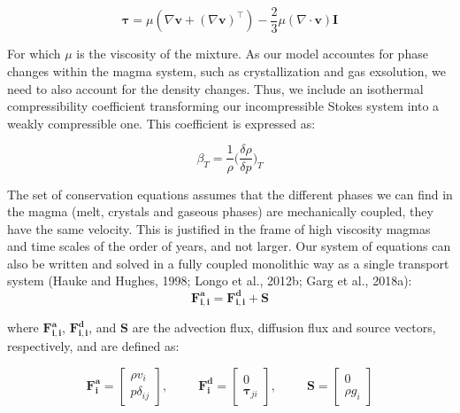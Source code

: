 \begin{equation}
	\boldsymbol{\tau} = \mu \left( \nabla \mathbf{v} + (\nabla \mathbf{v})^\top \right) - \frac{2}{3} \mu (\nabla \cdot \mathbf{v}) \mathbf{I}
\end{equation}

For which $\mu$ is the viscosity of the mixture.
As our model accountes for phase changes within the magma system, such as crystallization and gas exsolution, we need to also account for the density changes. Thus, we include an isothermal compressibility coefficient transforming our incompressible Stokes system into a weakly compressible one. This coefficient is expressed as:

\begin{equation}
	\beta_T = \frac{1}{\rho}\bigg(\frac{\delta\rho}{\delta p}\bigg)_T
\end{equation}

The set of conservation equations assumes that the different phases we can find in the magma (melt, crystals and gaseous phases) are mechanically coupled, they have the same velocity. This is justified in the frame of high viscosity magmas and time scales of the order of years, and not larger. 
Our system of equations can also be written and solved in a fully coupled monolithic way as a single transport system (Hauke and Hughes, 1998; Longo et al., 2012b; Garg et al., 2018a):
\begin{equation}
	\boldsymbol{F^{a}_{i,i}} = \boldsymbol{F^{d}_{i,i}} + \boldsymbol{S}
\end{equation}


where $\boldsymbol{F_{i,i}^{a}}$, $\boldsymbol{F_{i,i}^{d}}$, and $\boldsymbol{S}$ are the advection flux, diffusion flux and source vectors, respectively, and are defined as:

\begin{equation}
	\boldsymbol{F^{a}_{i}} = 
	\begin{bmatrix}
		\rho v_i\\
		p\delta_{ij} 
	\end{bmatrix}, ~~~~~~~~~~~
	\boldsymbol{F^{d}_{i}} = 
	\begin{bmatrix}
		0\\
		\mathbf{\tau}_{ji}
	\end{bmatrix}, ~~~~~~~~~~~
	\boldsymbol{S} =
	\begin{bmatrix}
		0\\
		\rho g_i
	\end{bmatrix}
\end{equation}

